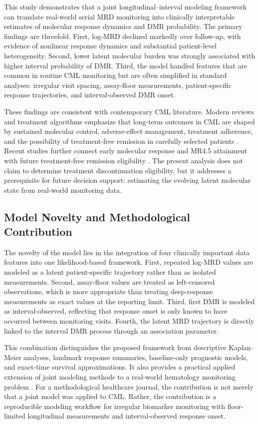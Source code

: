 This study demonstrates that a joint longitudinal--interval modeling framework can translate real-world serial MRD monitoring into clinically interpretable estimates of molecular response dynamics and DMR probability. The primary findings are threefold. First, log-MRD declined markedly over follow-up, with evidence of nonlinear response dynamics and substantial patient-level heterogeneity. Second, lower latent molecular burden was strongly associated with higher interval probability of DMR. Third, the model handled features that are common in routine CML monitoring but are often simplified in standard analyses: irregular visit spacing, assay-floor measurements, patient-specific response trajectories, and interval-observed DMR onset.

These findings are consistent with contemporary CML literature. Modern reviews and treatment algorithms emphasize that long-term outcomes in CML are shaped by sustained molecular control, adverse-effect management, treatment adherence, and the possibility of treatment-free remission in carefully selected patients \cite{Jabbour2025JAMAReview,Haddad2026Algorithms,Oehler2026TKIManagement}. Recent studies further connect early molecular response and MR4.5 attainment with future treatment-free remission eligibility \cite{Rasekh2026TFRPredictor,Ono2026MR45}. The present analysis does not claim to determine treatment discontinuation eligibility, but it addresses a prerequisite for future decision support: estimating the evolving latent molecular state from real-world monitoring data.

\subsection{Model Novelty and Methodological Contribution}

The novelty of the model lies in the integration of four clinically important data features into one likelihood-based framework. First, repeated log-MRD values are modeled as a latent patient-specific trajectory rather than as isolated measurements. Second, assay-floor values are treated as left-censored observations, which is more appropriate than treating deep-response measurements as exact values at the reporting limit. Third, first DMR is modeled as interval-observed, reflecting that response onset is only known to have occurred between monitoring visits. Fourth, the latent MRD trajectory is directly linked to the interval DMR process through an association parameter.

This combination distinguishes the proposed framework from descriptive Kaplan--Meier analyses, landmark response summaries, baseline-only prognostic models, and exact-time survival approximations. It also provides a practical applied extension of joint modeling methods to a real-world hematology monitoring problem \cite{Wulfsohn1997JointModel,Rizopoulos2016JMbayes,Lovblom2026MixedObservationJointModel}. For a methodological healthcare journal, the contribution is not merely that a joint model was applied to CML. Rather, the contribution is a reproducible modeling workflow for irregular biomarker monitoring with floor-limited longitudinal measurements and interval-observed response onset.

